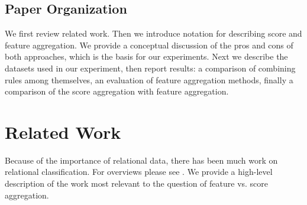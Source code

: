 \documentclass[conference]{IEEEtran}
\begin{document}
\subsection{Paper Organization} We first review related work. Then we introduce notation for describing score and feature aggregation. We provide a conceptual discussion of the pros and cons of both approaches, which is the basis for our experiments. Next we describe the datasets used in our experiment, then report results: a comparison of combining rules among themselves, an evaluation of feature aggregation methods, finally a comparison of the score aggregation with feature aggregation.

\section{Related Work}
Because of the importance of relational data, there has been much work on relational classification. For overviews please see \cite{han2009,Bina2012}. We provide a high-level description of the work most relevant to the question of feature vs. score aggregation.

\end{document}
